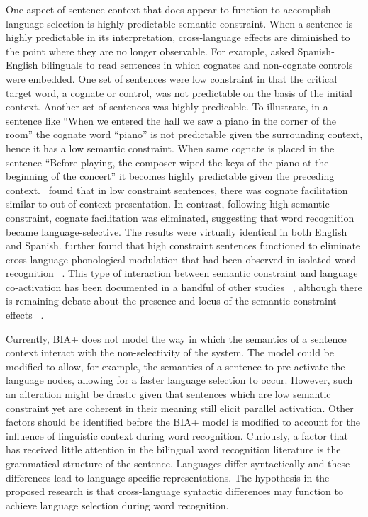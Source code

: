 One aspect of sentence context that does appear to function to accomplish language selection is highly predictable semantic constraint. When a sentence is highly predictable in its interpretation, cross-language effects are diminished to the point where they are no longer observable. For example,  \citet{Schwartz2006} asked Spanish-English bilinguals to read sentences in which cognates and non-cognate controls were embedded. One set of sentences were low constraint in that the critical target word, a cognate or control, was not predictable on the basis of the initial context. Another set of sentences was highly predicable. To illustrate, in a sentence like ``When we entered the hall we saw a piano in the corner of the room'' the cognate word ``piano'' is not predictable given the surrounding context, hence it has a low semantic constraint. When same cognate is placed in the sentence ``Before playing, the composer wiped the keys of the piano at the beginning of the concert'' it becomes highly predictable given the preceding context. ~\citep{Schwartz2006}found that in low constraint sentences, there was cognate facilitation similar to out of context presentation. In contrast, following high semantic constraint, cognate facilitation was eliminated, suggesting that word recognition became language-selective. The results were virtually identical in both English and Spanish.  \citet{Schwartz2003} further found that high constraint sentences functioned to eliminate cross-language phonological modulation that had been observed in isolated word recognition ~\citep[e.g.,][]{Schwartz2007}. This type of interaction between semantic constraint and language co-activation has been documented in a handful of other studies ~\citep[e.g.,][]{Chambers2009, Libben2009, Titone2011, VanHell2008}, although there is remaining debate about the presence and locus of the semantic constraint effects ~\citep[e.g., see][]{VanAssche2010}. 

Currently, BIA+ does not model the way in which the semantics of a sentence context interact with the non-selectivity of the system. The model could be modified to allow, for example, the semantics of a sentence to pre-activate the language nodes, allowing for a faster language selection to occur. However, such an alteration might be drastic given that sentences which are low semantic constraint yet are coherent in their meaning still elicit parallel activation. Other factors should be identified before the BIA+ model is modified to account for the influence of linguistic context during word recognition. Curiously, a factor that has received little attention in the bilingual word recognition literature is the grammatical structure of the sentence. Languages differ syntactically and these differences lead to language-specific representations. The hypothesis in the proposed research is that cross-language syntactic differences may function to achieve language selection during word recognition.

